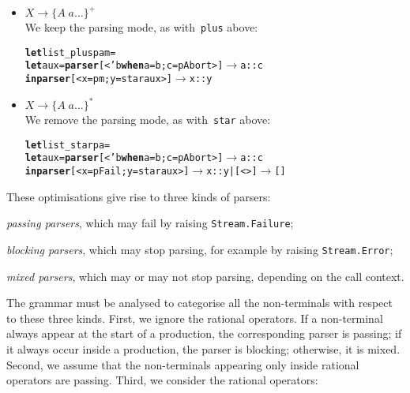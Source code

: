 \begin{itemize}
  \item \(X \rightarrow \{A \; a \ldots\}^+\)\\ We keep the parsing
    mode, as with~\texttt{plus} above:
\begin{alltt}
\textbf{let} list\_plus p a m =
  \textbf{let} aux = \textbf{parser} [< 'b \textbf{when} a=b; c=p Abort >] \(\rightarrow\) a::c
\textbf{in parser} [< x=p m; y=star aux >] \(\rightarrow\) x::y
\end{alltt}

  \item \(X \rightarrow \{A \; a \ldots\}^*\)\\ We remove the parsing
    mode, as with~\texttt{star} above:
\begin{alltt}
\textbf{let} list\_star p a =
  \textbf{let} aux = \textbf{parser} [< 'b \textbf{when} a=b; c=p Abort >] \(\rightarrow\) a::c
\textbf{in parser} [< x=p Fail; y=star aux >] \(\rightarrow\) x::y | [<>] \(\rightarrow\) []
\end{alltt}

\end{itemize}
These optimisations give rise to three kinds of parsers:
\begin{enumerate*}

  \item \emph{passing parsers}, which may fail by raising
    \texttt{Stream.Failure};

  \item \emph{blocking parsers}, which may stop parsing, for example
    by raising \texttt{Stream.Error};

  \item \emph{mixed parsers}, which may or may not stop parsing,
    depending on the call context.

\end{enumerate*}
The grammar must be analysed to categorise all the non\hyp{}terminals
with respect to these three kinds. First, we ignore the rational
operators. If a non\hyp{}terminal always appear at the start of a
production, the corresponding parser is passing; if it always occur
inside a production, the parser is blocking; otherwise, it is
mixed. Second, we assume that the non\hyp{}terminals appearing only
inside rational operators are passing. Third, we consider the rational
operators:
